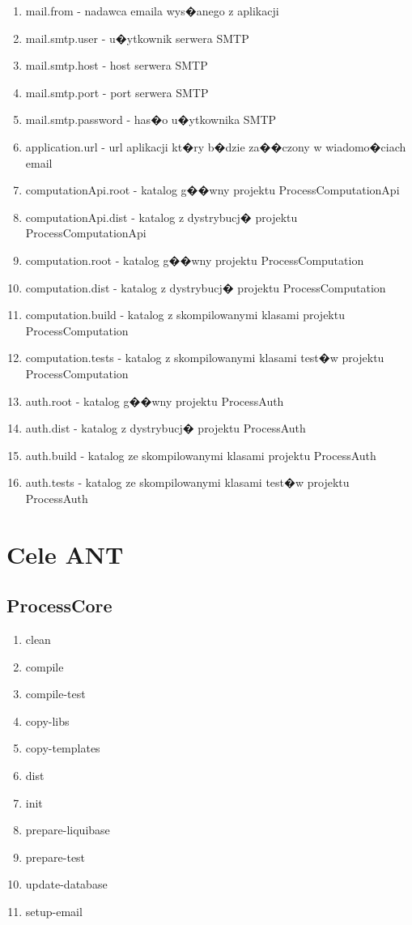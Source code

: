 \documentclass{article}
\begin{document}
{\begin{enumerate}
\item mail.from - nadawca emaila wys�anego z aplikacji
\item mail.smtp.user - u�ytkownik serwera SMTP
\item mail.smtp.host - host serwera SMTP
\item mail.smtp.port - port serwera SMTP
\item mail.smtp.password - has�o u�ytkownika SMTP
\item application.url - url aplikacji kt�ry b�dzie za��czony w wiadomo�ciach email

\item computationApi.root - katalog g��wny projektu ProcessComputationApi
\item computationApi.dist - katalog z dystrybucj� projektu ProcessComputationApi

\item computation.root - katalog g��wny projektu ProcessComputation
\item computation.dist - katalog z dystrybucj� projektu ProcessComputation
\item computation.build - katalog z skompilowanymi klasami projektu ProcessComputation
\item computation.tests - katalog z skompilowanymi klasami test�w projektu ProcessComputation

\item auth.root - katalog g��wny projektu ProcessAuth
\item auth.dist - katalog z dystrybucj� projektu ProcessAuth
\item auth.build - katalog ze skompilowanymi klasami projektu ProcessAuth
\item auth.tests - katalog ze skompilowanymi klasami test�w projektu ProcessAuth


\end{enumerate}
}

\section{Cele ANT}

\subsection{ProcessCore}
{\small
\begin{enumerate}
  \item clean
  \item compile
  \item compile-test
  \item copy-libs
  \item copy-templates
  \item dist
  \item init
  \item prepare-liquibase
  \item prepare-test
  \item update-database
  \item setup-email
\end{enumerate}
}
\end{document}
